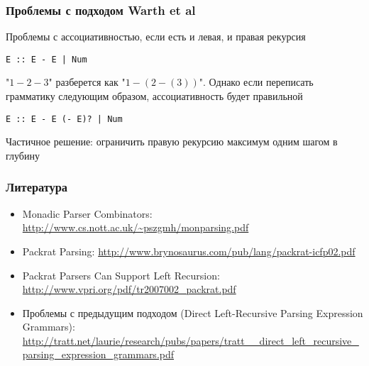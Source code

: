 \documentclass{beamer}
\begin{document}
\begin{frame}[fragile]
  \transwipe[direction=90]
  \frametitle{Проблемы с подходом Warth et al}
Проблемы с ассоциативностью, если есть и левая, и правая рекурсия

\begin{verbatim}
E :: E - E | Num
\end{verbatim}

"$1-2-3$" разберется как "$1-(2-(3))$". Однако если переписать грамматику 
следующим образом, ассоциативность будет правильной

\begin{verbatim}
E :: E - E (- E)? | Num
\end{verbatim}

Частичное решение: ограничить правую рекурсию максимум одним шагом в глубину

\end{frame}

\begin{frame}[fragile]
  \transwipe[direction=90]
  \frametitle{Литература}
\begin{itemize}
  \item Monadic Parser Combinators: \url{http://www.cs.nott.ac.uk/~pszgmh/monparsing.pdf}
  \item Packrat Parsing: \url{http://www.brynosaurus.com/pub/lang/packrat-icfp02.pdf}
  \item Packrat Parsers Can Support Left Recursion: \url{http://www.vpri.org/pdf/tr2007002_packrat.pdf}
  \item Проблемы с предыдущим подходом (Direct Left-Recursive Parsing Expression Grammars): \url{http://tratt.net/laurie/research/pubs/papers/tratt__direct_left_recursive_parsing_expression_grammars.pdf}
\end{itemize}

\end{frame}
\end{document}
